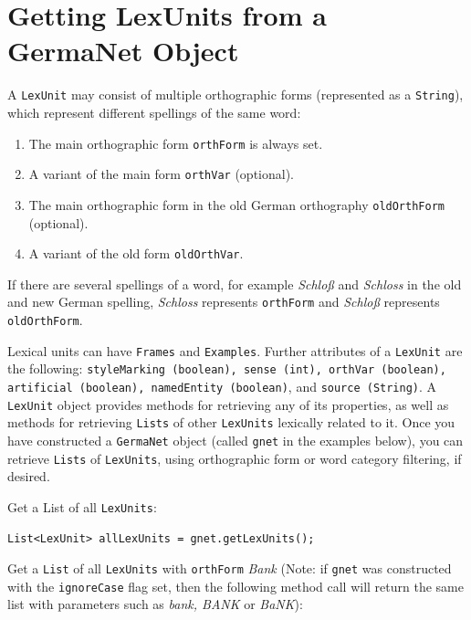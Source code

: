 \documentclass[12pt,a4paper,english,utf8]{report}
\begin{document}
\section{Getting LexUnits from a GermaNet Object}
A \texttt{LexUnit} may consist of multiple orthographic forms (represented as a \texttt{String}), which represent different spellings of the same word:

\begin{enumerate}
	\item The main orthographic form \texttt{orthForm} is always set.
	\item A variant of the main form \texttt{orthVar} (optional).
	\item The main orthographic form in the old German orthography \texttt{oldOrthForm} (optional).
	\item A variant of the old form \texttt{oldOrthVar}.
\end{enumerate}

If there are several spellings of a word, for example \emph{Schloß} and \emph{Schloss} in the old and new German spelling, \emph{Schloss} represents \texttt{orthForm} and \emph{Schloß} represents \texttt{oldOrthForm}.

\begin{sloppypar}
Lexical units can have \texttt{Frames} and \texttt{Examples}. Further attributes of a \texttt{LexUnit} are the following: \texttt{styleMarking (boolean), sense (int), orthVar (boolean), artificial (boolean), namedEntity (boolean)}, and \texttt{source (String)}. A \texttt{LexUnit} object provides methods for retrieving any of its properties, as well as methods for retrieving \texttt{Lists} of other \texttt{LexUnits} lexically related to it. Once you have constructed a \texttt{GermaNet} object (called \texttt{gnet} in the examples below), you can retrieve \texttt{Lists} of \texttt{LexUnits}, using orthographic form or word category filtering, if desired.
\end{sloppypar}

Get a List of all \texttt{LexUnits}:

\begin{lstlisting}
List<LexUnit> allLexUnits = gnet.getLexUnits();
\end{lstlisting}

Get a \texttt{List} of all \texttt{LexUnits} with \texttt{orthForm} \emph{Bank} (Note: if \texttt{gnet} was constructed with the \texttt{ignoreCase} flag set, then the following method call will return the same list with parameters such as \emph{bank, BANK} or \emph{BaNK}):
\end{document}
